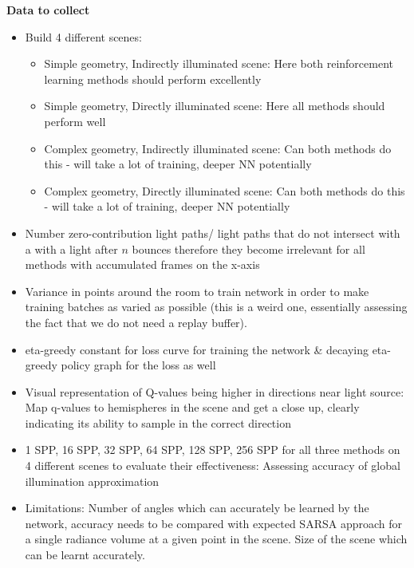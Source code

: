 \documentclass[ %
                    author={Callum Pearce},
                supervisor={Dr. Neill Campbell},
                    degree={MEng},
                     title={How effective are Temporal difference learning methods for reducing the number of zero contribution light paths while still accurately approximating Global Illumination in Path tracing?},
                  subtitle={},
                      type={research},
                      year={2019} ]{dissertation}
\begin{document}
\textbf{Data to collect}
\begin{itemize}

\item Build 4 different scenes:

\begin{itemize}
\item Simple geometry, Indirectly illuminated scene: Here both reinforcement learning methods should perform excellently

\item Simple geometry, Directly illuminated scene: Here all methods should perform well

\item Complex geometry, Indirectly illuminated scene: Can both methods do this - will take a lot of training, deeper NN potentially

\item Complex geometry, Directly illuminated scene: Can both methods do this - will take a lot of training, deeper NN potentially
\end{itemize}

\item Number zero-contribution light paths/ light paths that do not intersect with a with a light after $n$ bounces therefore they become irrelevant for all methods with accumulated frames on the x-axis

\item Variance in points around the room to train network in order to make training batches as varied as possible (this is a weird one, essentially assessing the fact that we do not need a replay buffer).

\item eta-greedy constant for loss curve for training the network \& decaying eta-greedy policy graph for the loss as well

\item Visual representation of Q-values being higher in directions near light source: Map q-values to hemispheres in the scene and get a close up, clearly indicating its ability to sample in the correct direction

\item 1 SPP, 16 SPP, 32 SPP, 64 SPP, 128 SPP, 256 SPP for all three methods on 4 different scenes to evaluate their effectiveness: Assessing accuracy of global illumination approximation

\item Limitations: Number of angles which can accurately be learned by the network, accuracy  needs to be compared with expected SARSA approach for a single radiance volume at a given point in the scene. Size of the scene which can be learnt accurately.

\end{itemize}
\end{document}
